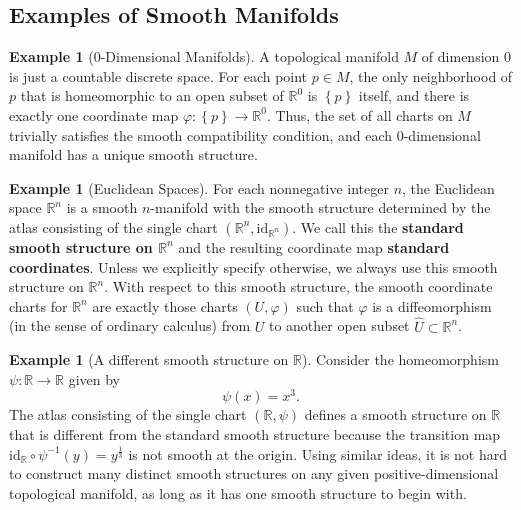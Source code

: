 \documentclass[reqno]{amsart}
\theoremstyle{plain}%
\theoremstyle{definition}
\newtheorem{example}[theorem]{Example}
\theoremstyle{remark}
\newcommand{\id}{{\mathrm{id}}}
\begin{document}
    \subsection*{Examples of Smooth Manifolds}
        \begin{example}[0-Dimensional Manifolds]
         A topological manifold $M$ of dimension $0$ is just a countable discrete
         space. For each point $p \in M$, the only neighborhood of $p$ that is
         homeomorphic to an open subset of $\mathbb{R}^{0}$ is 
         $\left\{ p \right\} $ itself, and there is exactly one coordinate map
         $\varphi  \colon \left\{ p \right\} \to \mathbb{R}^{0}$. Thus, the set of
         all charts on $M$ trivially satisfies the smooth compatibility condition,
         and each $0$-dimensional manifold has a unique smooth structure.
        \end{example}

        \begin{example}[Euclidean Spaces]
         For each nonnegative integer $n$, the Euclidean space
         $\mathbb{R}^{n}$ is a smooth $n$-manifold with the smooth structure
         determined by the atlas consisting of the single chart $\left(
         \mathbb{R}^{n}, \id_{\mathbb{R}^{n}} \right) $. We call this the
         \textbf{standard smooth structure on $\mathbb{R}^{n}$} and the resulting
         coordinate map \textbf{standard coordinates}. Unless we explicitly specify
         otherwise, we always use this smooth structure on $\mathbb{R}^{n}$. With
         respect to this smooth structure, the smooth coordinate charts for
         $\mathbb{R}^{n}$ are exactly those charts $\left( U, \varphi \right)
         $ such that $\varphi$ is a diffeomorphism (in the sense of ordinary
         calculus) from $U$ to another open subset $\hat{U} \subset
         \mathbb{R}^{n}$.
        \end{example}

        \begin{example}[A different smooth structure on $\mathbb{R}$]
         Consider the homeomorphism $\psi  \colon \mathbb{R} \to \mathbb{R}$ given
         by
         \[
         \psi(x) = x^3.
         \] 
         The atlas consisting of the single chart $\left( \mathbb{R}, \psi \right)
         $ defines a smooth structure on $\mathbb{R}$ that is different from the
         standard smooth structure because the transition map
         $\id_{\mathbb{R}} \circ \psi^{-1} (y) = y^{\frac{1}{3}}$ is not smooth at
         the origin. Using similar ideas, it is not hard to construct many distinct
         smooth structures on any given positive-dimensional topological manifold,
         as long as it has one smooth structure to begin with.
        \end{example}
\end{document}
